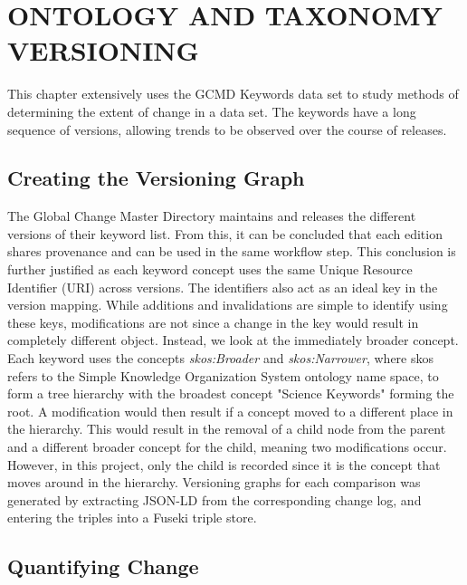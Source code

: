
\chapter{ONTOLOGY AND TAXONOMY VERSIONING}

This chapter extensively uses the GCMD Keywords data set to study methods of determining the extent of change in a data set.
The keywords have a long sequence of versions, allowing trends to be observed over the course of releases.

\section{Creating the Versioning Graph}

The Global Change Master Directory maintains and releases the different versions of their keyword list.
From this, it can be concluded that each edition shares provenance and can be used in the same workflow step.
This conclusion is further justified as each keyword concept uses the same Unique Resource Identifier (URI) across versions.
The identifiers also act as an ideal key in the version mapping.
While additions and invalidations are simple to identify using these keys, modifications are not since a change in the key would result in completely different object.
Instead, we look at the immediately broader concept.
Each keyword uses the concepts \textit{skos:Broader} and \textit{skos:Narrower}, where skos refers to the Simple Knowledge Organization System ontology name space, to form a tree hierarchy with the broadest concept "Science Keywords" forming the root.
A modification would then result if a concept moved to a different place in the hierarchy.
This would result in the removal of a child node from the parent and a different broader concept for the child, meaning two modifications occur.
However, in this project, only the child is recorded since it is the concept that moves around in the hierarchy.
Versioning graphs for each comparison was generated by extracting JSON-LD from the corresponding change log, and entering the triples into a Fuseki triple store.

\section{Quantifying Change}

